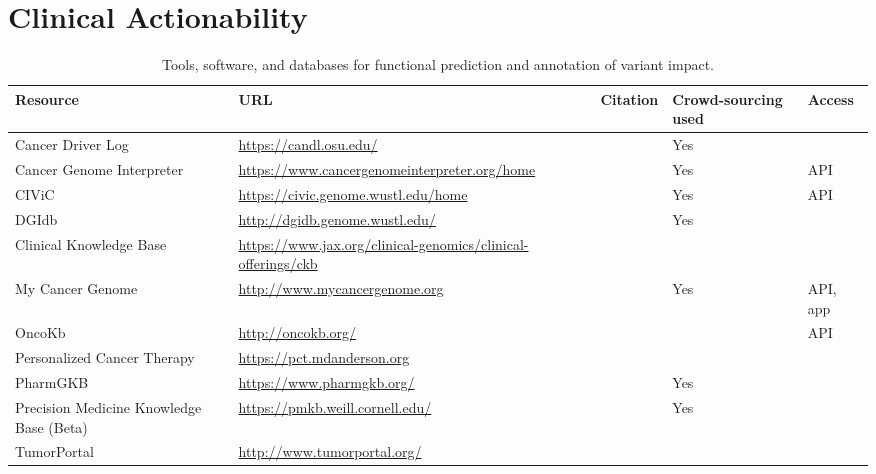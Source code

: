 \documentclass{article}
\begin{document}
\section{Clinical Actionability}


\begin{table}[p]
\centering
\begin{tabularx}{\textwidth}{p{3cm}XXp{1.5cm}p{1.5cm}}
  \hline
  Resource & URL & Citation & Crowd-sourcing used & Access \\
  \hline
  Cancer Driver Log & \url{https://candl.osu.edu/} & \cite{Damodaran2015-so} & Yes & \\
  Cancer Genome Interpreter & \url{https://www.cancergenomeinterpreter.org/home} & \cite{Tamborero2017-ay} & Yes & API \\
  CIViC & \url{https://civic.genome.wustl.edu/home} & \cite{Griffith2016-sy} & Yes & API \\
  DGIdb & \url{http://dgidb.genome.wustl.edu/} & \cite{Wagner2016-fs,Griffith2013-uv} & Yes & \\
  Clinical Knowledge Base & \url{https://www.jax.org/clinical-genomics/clinical-offerings/ckb} & & & \\
  My Cancer Genome & \url{http://www.mycancergenome.org} & \cite{Micheel2014-pz} & Yes & API, app \\
  OncoKb & \url{http://oncokb.org/} & \cite{Chakravarty2017-gx} & & API \\
  Personalized Cancer Therapy & \url{https://pct.mdanderson.org} & & \\
  PharmGKB & \url{https://www.pharmgkb.org/} &  \cite{Hewett2002-yu} & Yes & \\
  Precision Medicine Knowledge Base (Beta) & \url{https://pmkb.weill.cornell.edu/} & \cite{Huang2016-zx} & Yes & \\
  TumorPortal & \url{http://www.tumorportal.org/} &
  \cite{Lawrence2014-ss} & & \\
  \hline
\end{tabularx}
\caption{Tools, software, and databases for functional prediction and annotation of variant impact. }
\label{table:3}
\end{table}
 
 
\end{document}
